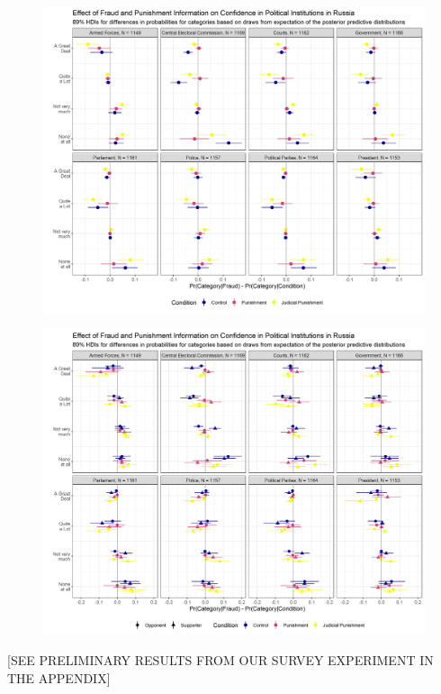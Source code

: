 \documentclass[11pt, ngerman,english,a4]{article}
\begin{document}
\begin{figure}[H]
    \centering
    \includegraphics[width=\linewidth,trim=4 4 4 4,clip]{figs/ru_hdi89.png}
    \end{figure}

\begin{figure}[H]
    \centering
    \includegraphics[width=\linewidth,trim=4 4 4 4,clip]{figs/ru_hdi89_conditional.png}
    \end{figure}


\begin{center}
    [SEE PRELIMINARY RESULTS FROM OUR SURVEY EXPERIMENT IN THE APPENDIX]
\end{center}
\end{document}
